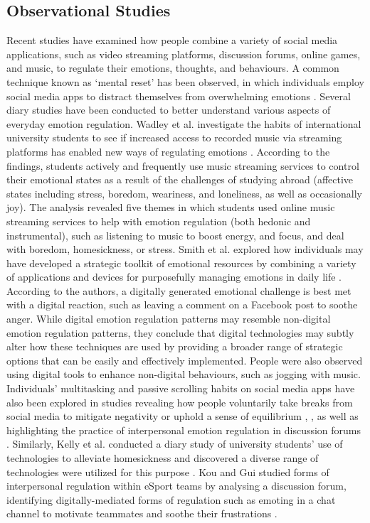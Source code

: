 \documentclass[lettersize,journal]{IEEEtran}
\begin{document}
\subsection{Observational Studies}
Recent studies have examined how people combine a variety of social media applications, such as video streaming platforms, discussion forums, online games, and music, to regulate their emotions, thoughts, and behaviours. A common technique known as `mental reset' has been observed, in which individuals employ social media apps to distract themselves from overwhelming emotions \cite{eschler2020emergent}. Several diary studies have been conducted to better understand various aspects of everyday emotion regulation. Wadley et al. investigate the habits of international university students to see if increased access to recorded music via streaming platforms has enabled new ways of regulating emotions \cite{wadley2019use}. According to the findings, students actively and frequently use music streaming services to control their emotional states as a result of the challenges of studying abroad (affective states including stress, boredom, weariness, and loneliness, as well as occasionally joy). The analysis revealed five themes in which students used online music streaming services to help with emotion regulation (both hedonic and instrumental), such as listening to music to boost energy, and focus, and deal with boredom, homesickness, or stress. Smith et al. explored how individuals may have developed a strategic toolkit of emotional resources by combining a variety of applications and devices for purposefully managing emotions in daily life \cite{smith2022digital}. According to the authors, a digitally generated emotional challenge is best met with a digital reaction, such as leaving a comment on a Facebook post to soothe anger. While digital emotion regulation patterns may resemble non-digital emotion regulation patterns, they conclude that digital technologies may subtly alter how these techniques are used by providing a broader range of strategic options that can be easily and effectively implemented. People were also observed using digital tools to enhance non-digital behaviours, such as jogging with music. Individuals' multitasking and passive scrolling habits on social media apps have also been explored in studies revealing how people voluntarily take breaks from social media to mitigate negativity or uphold a sense of equilibrium \cite{lukoff2018makes}, \cite{mark2015focused}, as well as highlighting the practice of interpersonal emotion regulation in discussion forums \cite{smith2022digital}. Similarly, Kelly et al. conducted a diary study of university students' use of technologies to alleviate homesickness and discovered a diverse range of technologies were utilized for this purpose \cite{kelly2021s}. Kou and Gui studied forms of interpersonal regulation within eSport teams by analysing a discussion forum, identifying digitally-mediated forms of regulation such as emoting in a chat channel to motivate teammates and soothe their frustrations \cite{kou2020emotion}.
\end{document}
